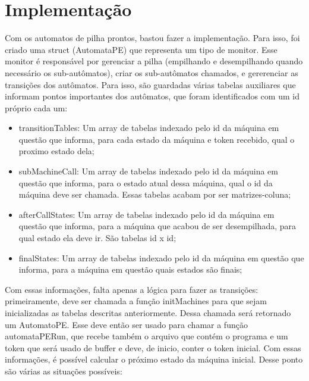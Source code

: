 \label{Cap:Rotinas}

\section{Implementação}
Com os automatos de pilha prontos, bastou fazer a implementação. Para isso, foi criado uma struct (AutomataPE) que representa um tipo de monitor. Esse monitor é responsável por gerenciar a pilha (empilhando e desempilhando quando necessário os sub-autômatos), criar os sub-autômatos chamados, e gererenciar as transições dos autômatos. Para isso, são guardadas várias tabelas auxiliares que informam pontos importantes dos autômatos, que foram identificados com um id próprio cada um:
\begin{itemize}
\item transitionTables: Um array de tabelas indexado pelo id da máquina em questão que informa, para cada estado da máquina e token recebido, qual o proximo estado dela; 
\item subMachineCall: Um array de tabelas indexado pelo id da máquina em questão que informa, para o estado atual dessa máquina, qual o id da máquina deve ser chamada. Essas tabelas acabam por ser matrizes-coluna;
\item afterCallStates: Um array de tabelas indexado pelo id da máquina em questão que informa, para a máquina que acabou de ser desempilhada, para qual estado ela deve ir. São tabelas id x id;
\item finalStates:  Um array de tabelas indexado pelo id da máquina em questão que informa, para a máquina em questão quais estados são finais;

\end{itemize}

Com essas informações, falta apenas a lógica para fazer as transições:
primeiramente, deve ser chamada a função initMachines para que sejam inicializadas as tabelas descritas anteriormente. Dessa chamada será retornado um AutomatoPE. Esse deve então ser usado para chamar a função automataPERun, que recebe também o arquivo que contém o programa e um token que será usado de buffer e deve, de inicio, conter o token inicial. Com essas informações, é possível calcular o próximo estado da máquina inicial. Desse ponto são várias as situações possíveis:

